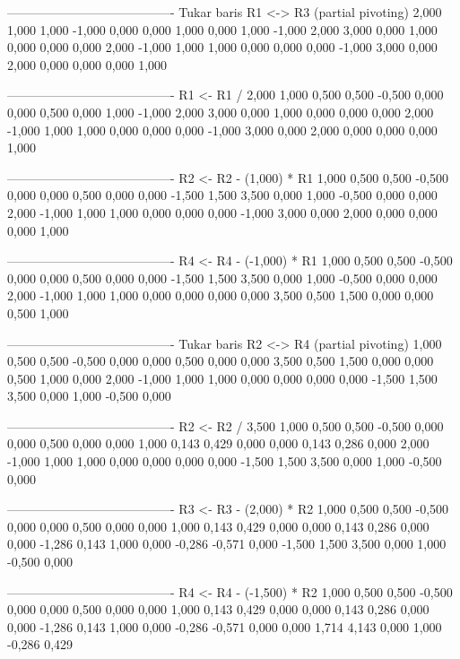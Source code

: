 \documentclass[12pt]{article}
\begin{document}
\begin{enumerate}
\begin{keluaran}
----------------------------------------
Tukar baris R1 <-> R3 (partial pivoting)
2,000   1,000   1,000   -1,000  0,000   0,000   1,000   0,000
1,000   -1,000  2,000   3,000   0,000   1,000   0,000   0,000
0,000   2,000   -1,000  1,000   1,000   0,000   0,000   0,000
-1,000  3,000   0,000   2,000   0,000   0,000   0,000   1,000

----------------------------------------
R1 <- R1 / 2,000
1,000   0,500   0,500   -0,500  0,000   0,000   0,500   0,000
1,000   -1,000  2,000   3,000   0,000   1,000   0,000   0,000
0,000   2,000   -1,000  1,000   1,000   0,000   0,000   0,000
-1,000  3,000   0,000   2,000   0,000   0,000   0,000   1,000

----------------------------------------
R2 <- R2 - (1,000) * R1
1,000   0,500   0,500   -0,500  0,000   0,000   0,500   0,000
0,000   -1,500  1,500   3,500   0,000   1,000   -0,500  0,000
0,000   2,000   -1,000  1,000   1,000   0,000   0,000   0,000
-1,000  3,000   0,000   2,000   0,000   0,000   0,000   1,000

----------------------------------------
R4 <- R4 - (-1,000) * R1
1,000   0,500   0,500   -0,500  0,000   0,000   0,500   0,000
0,000   -1,500  1,500   3,500   0,000   1,000   -0,500  0,000
0,000   2,000   -1,000  1,000   1,000   0,000   0,000   0,000
0,000   3,500   0,500   1,500   0,000   0,000   0,500   1,000

----------------------------------------
Tukar baris R2 <-> R4 (partial pivoting)
1,000   0,500   0,500   -0,500  0,000   0,000   0,500   0,000
0,000   3,500   0,500   1,500   0,000   0,000   0,500   1,000
0,000   2,000   -1,000  1,000   1,000   0,000   0,000   0,000
0,000   -1,500  1,500   3,500   0,000   1,000   -0,500  0,000

----------------------------------------
R2 <- R2 / 3,500
1,000   0,500   0,500   -0,500  0,000   0,000   0,500   0,000
0,000   1,000   0,143   0,429   0,000   0,000   0,143   0,286
0,000   2,000   -1,000  1,000   1,000   0,000   0,000   0,000
0,000   -1,500  1,500   3,500   0,000   1,000   -0,500  0,000

----------------------------------------
R3 <- R3 - (2,000) * R2
1,000   0,500   0,500   -0,500  0,000   0,000   0,500   0,000
0,000   1,000   0,143   0,429   0,000   0,000   0,143   0,286
0,000   0,000   -1,286  0,143   1,000   0,000   -0,286  -0,571
0,000   -1,500  1,500   3,500   0,000   1,000   -0,500  0,000

----------------------------------------
R4 <- R4 - (-1,500) * R2
1,000   0,500   0,500   -0,500  0,000   0,000   0,500   0,000
0,000   1,000   0,143   0,429   0,000   0,000   0,143   0,286
0,000   0,000   -1,286  0,143   1,000   0,000   -0,286  -0,571
0,000   0,000   1,714   4,143   0,000   1,000   -0,286  0,429


\end{keluaran}
\end{enumerate}
\end{document}
